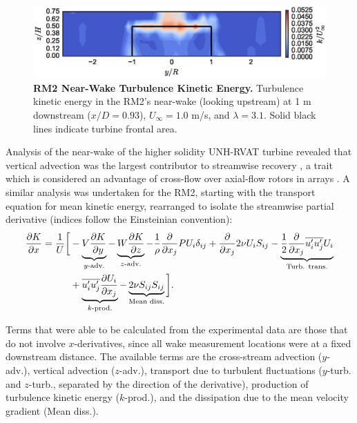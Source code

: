 \documentclass[10pt,letterpaper]{article}
\def \p{\partial}
\begin{document}
\begin{figure}
    \includegraphics[width=\textwidth]{figures/k_contours.eps}

    \caption{{\bf RM2 Near-Wake Turbulence Kinetic Energy.} Turbulence kinetic
        energy in the RM2's near-wake (looking upstream) at 1 m downstream
        ($x/D=0.93$), $U_\infty=1.0$ m/s, and $\lambda=3.1$. Solid black lines
        indicate turbine frontal area.}

    \label{fig:kcont}
\end{figure}

Analysis of the near-wake of the higher solidity UNH-RVAT turbine revealed that
vertical advection was the largest contributor to streamwise recovery
\cite{Bachant2015-JoT}, a trait which is considered an advantage of cross-flow
over axial-flow rotors in arrays \cite{Kinzel2012}. A similar analysis was
undertaken for the RM2, starting with the transport equation for mean kinetic
energy, rearranged to isolate the streamwise partial derivative (indices follow
the Einsteinian convention):
\begin{equation}
    \begin{split}
        \frac{\p K}{\p x}
        =
        \frac{1}{U}
        \bigg{[}
        & - \underbrace{V \frac{\p K}{\p y}}_{y\text{-adv.}}
        - \underbrace{W \frac{\p K}{\p z}}_{z\text{-adv.}}
        - \frac{1}{\rho}\frac{\p}{\p x_j} P U_i \delta_{ij}
        + \frac{\p}{\p x_j} 2 \nu U_i S_{ij}
        - \underbrace{
            \frac{1}{2}\frac{\p}{\p x_j} \overline{u_i' u_j'} U_i
        }_{\text{Turb. trans.}} \\
        & + 
        \underbrace{
            \overline{u_i' u_j'} \frac{\p U_i}{\p x_j}
        }_{k\text{-prod.}}
        - 
        \underbrace{
            2 \nu S_{ij}S_{ij}
        }_{\text{Mean diss.}}
        \bigg{]}.
    \end{split}
    \label{eq:K-full}
\end{equation}

Terms that were able to be calculated from the experimental data are those that
do not involve $x$-derivatives, since all wake measurement locations were at a
fixed downstream distance. The available terms are the cross-stream advection
($y$-adv.), vertical advection ($z$-adv.), transport due to turbulent
fluctuations ($y$-turb. and $z$-turb., separated by the direction of the
derivative), production of turbulence kinetic energy ($k$-prod.), and the
dissipation due to the mean velocity gradient (Mean diss.).
\end{document}
